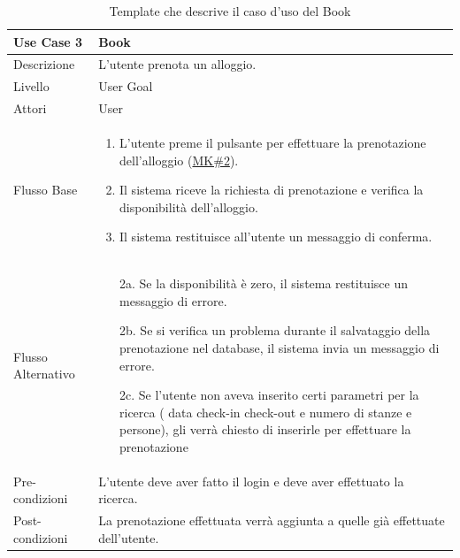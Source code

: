 \documentclass[10pt]{article}
\begin{document}
\begin{center}
\begin{table}[H]
{\begin{tabular}{|l|p{9cm}|}
\hline
Use Case 3 & Book \\ \hline
Descrizione & L'utente prenota un alloggio. \\ \hline
Livello & User Goal \\ \hline
Attori & User \\ \hline
Flusso Base & 
\begin{enumerate}
    \item L'utente preme il pulsante per effettuare la prenotazione dell'alloggio (\hyperref[mk2]{MK\#2}).
    \item Il sistema riceve la richiesta di prenotazione e verifica la disponibilità dell'alloggio.
    \item Il sistema restituisce all'utente un messaggio di conferma.
\end{enumerate} \\ \hline
Flusso Alternativo & 
\begin{enumerate}
    \item[2a.] Se la disponibilità è zero, il sistema restituisce un messaggio di errore.
    \item[2b.] Se si verifica un problema durante il salvataggio della prenotazione nel database, il sistema invia un messaggio di errore.
    \item[2c.] Se l'utente non aveva inserito certi parametri per la ricerca ( data check-in check-out e numero di stanze e persone), gli verrà chiesto di inserirle per effettuare la prenotazione
\end{enumerate} \\ \hline
Pre-condizioni & L'utente deve aver fatto il login e deve aver effettuato la ricerca. \\ \hline
Post-condizioni & La prenotazione effettuata verrà aggiunta a quelle già effettuate dell'utente. \\ \hline
\end{tabular}
}
\caption{Template che descrive il caso d'uso del Book}
\end{table}
\begin{table}[H]
\vspace{-0.3cm}
\centering
{}
\end{table}
\end{center}
\end{document}
